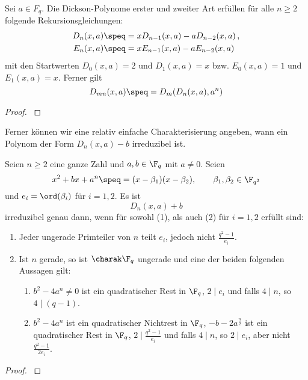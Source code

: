 \begin{proposition}
  \label{satz:dickson_2}
  Sei $a \in F_q$. Die Dickson-Polynome erster und zweiter Art 
  erfüllen für alle $n\geq 2$ folgende Rekursionsgleichungen:
  \begin{align*}
    D_n(x,a) &\speq= xD_{n-1}(x,a) - a D_{n-2}(x,a) \,, \\
    E_n(x,a) &\speq= xE_{n-1}(x,a) - a E_{n-2}(x,a)
  \end{align*}
  mit den Startwerten $D_0(x,a) = 2$ und $D_1(x,a)=x$ bzw.
  $E_0(x,a) = 1$ und $E_1(x,a) = x$. Ferner gilt
  \[ D_{mn}(x,a) \speq= D_m(D_n(x,a),a^n)\]
\end{proposition}
\begin{proof}
  \autocite[??]{lidl1993dickson}
\end{proof}

Ferner können wir eine  relativ einfache Charakterisierung angeben, wann ein
Polynom der Form $D_n(x,a)-b$ irreduzibel ist.

\begin{proposition}
  \label{satz:dickson_irred}
  Seien $n\geq 2$ eine ganze Zahl und $a,b \in \F_q$ mit $a \neq 0$.
  Seien
  \[ x^2 + bx +a^n \speq= (x-\beta_1)(x-\beta_2), \qquad 
    \beta_1,\beta_2 \in \F_{q^2}\]
  und $e_i = \ord(\beta_i)$ für $i=1,2$. Es ist
  \[ D_n(x,a) + b \]
  irreduzibel genau dann, wenn für sowohl (1), als auch (2) für $i=1,2$ erfüllt
  sind:
  \begin{enumerate}
    \item Jeder ungerade Primteiler von $n$ teilt $e_i$, jedoch nicht
      $\tfrac{q^2-1}{e_i}$.
    \item Ist $n$ gerade, so ist $\charak \F_q$ ungerade und eine der beiden
      folgenden Aussagen gilt:
      \begin{enumerate}[label=(\arabic*')]
        \item $b^2-4a^n \neq 0$ ist ein quadratischer Rest in $\F_q$, $2\mid e_i$
          und falls $4\mid n$, so $4 \mid (q-1)$.
        \item $b^2-4a^n$ ist ein quadratischer Nichtrest in $\F_q$,
          $-b-2a^\frac n 2$ ist ein quadratischer Rest in $\F_q$, 
          $2 \mid \tfrac{q^2-1}{e_i}$ und falls $4\mid n$, so $2\mid e_i$, 
          aber nicht $\tfrac{q^2-1}{2e_i}$.
      \end{enumerate}
  \end{enumerate}
\end{proposition}
\begin{proof}
  \autocite[Theorem 4]{gao1994}
\end{proof}

